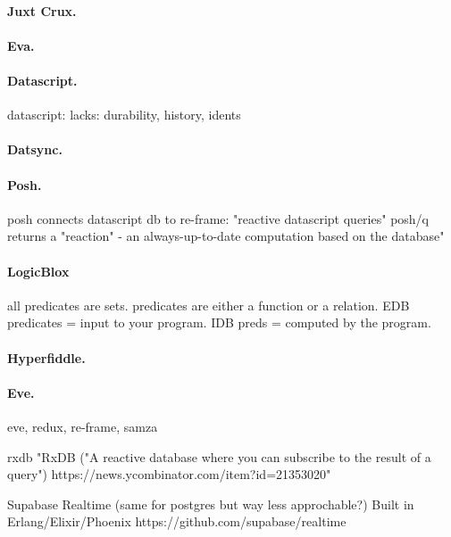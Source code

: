 \paragraph{Juxt Crux.}

\paragraph{Eva.}

\paragraph{Datascript.}
datascript: lacks: durability, history, idents

\paragraph{Datsync.}

\paragraph{Posh.}
posh connects datascript db to re-frame: "reactive datascript queries"
posh/q returns a "reaction" - an always-up-to-date computation based on the database"



\paragraph{LogicBlox} \cite{aref2015design}
all predicates are sets. predicates are either a function or a relation. EDB predicates = input to your program. IDB preds = computed by the program.

\paragraph{Hyperfiddle.} \cite{getz18hyperfiddle}

\paragraph{Eve.}
eve, redux, re-frame, samza



rxdb "RxDB ("A reactive database where you can subscribe to the result of a query")
https://news.ycombinator.com/item?id=21353020"

Supabase Realtime (same for postgres but way less approchable?) Built in Erlang/Elixir/Phoenix
https://github.com/supabase/realtime

